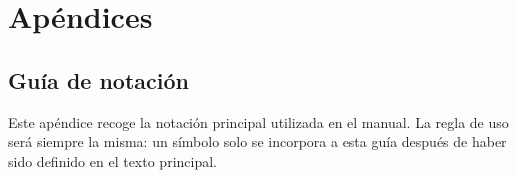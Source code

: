 \documentclass[11pt,a4paper,openany]{book}
\begin{document}














\appendix
\part{Apéndices}

\chapter{Guía de notación}

Este apéndice recoge la notación principal utilizada en el manual. La regla de uso será siempre la misma: un símbolo solo se incorpora a esta guía después de haber sido definido en el texto principal.
\end{document}
